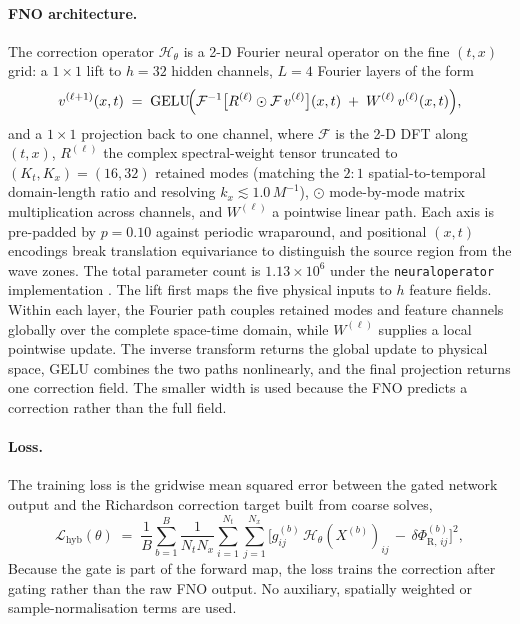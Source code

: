 \paragraph{FNO architecture.} The correction operator
$\mathcal{H}_{\theta}$ is a 2-D Fourier neural operator
\citep{Li2021fno,Kovachki2023neuralop} on the fine $(t, x)$
grid: a $1\times 1$ lift to $h = 32$ hidden channels, $L = 4$
Fourier layers of the form
\begin{equation}
  v^{(\ell+1)}(x, t)
  \;=\; \mathrm{GELU}\!\Bigl(
         \mathcal{F}^{-1}\bigl[R^{(\ell)} \odot
         \mathcal{F}\,v^{(\ell)}\bigr](x, t)
         \;+\; W^{(\ell)}\,v^{(\ell)}(x, t)
       \Bigr),
  \label{eq:hyb-fno-layer}
\end{equation}
and a $1\times 1$ projection back to one channel, where
$\mathcal{F}$ is the 2-D DFT along $(t, x)$, $R^{(\ell)}$ the
complex spectral-weight tensor truncated to
$(K_{t}, K_{x}) = (16, 32)$ retained modes (matching the $2{:}1$
spatial-to-temporal domain-length ratio and resolving
$k_{x} \lesssim 1.0\,M^{-1}$), $\odot$ mode-by-mode matrix
multiplication across channels, and $W^{(\ell)}$ a pointwise
linear path. Each axis is pre-padded by $p = 0.10$ against
periodic wraparound, and positional $(x, t)$ encodings break
translation equivariance to distinguish the source region from
the wave zones. The total parameter count is $1.13\times 10^{6}$ under the
\texttt{neuraloperator} implementation \citep{Kovachki2023neuralop}.
The lift first maps the five physical inputs to $h$ feature fields.
Within each layer, the Fourier path couples retained modes and feature
channels globally over the complete space-time domain, while
$W^{(\ell)}$ supplies a local pointwise update. The inverse transform
returns the global update to physical space, GELU combines the two
paths nonlinearly, and the final projection returns one correction
field. The smaller width is used because the FNO predicts a
correction rather than the full field.

\paragraph{Loss.} The training loss is the gridwise mean
squared error between the gated network output and the
Richardson correction target built from coarse solves,
\begin{equation}
  \mathcal{L}_{\mathrm{hyb}}(\theta)
  \;=\; \frac{1}{B}\sum_{b=1}^{B}
         \frac{1}{N_{t} N_{x}}
         \sum_{i=1}^{N_{t}}\sum_{j=1}^{N_{x}}
         \bigl[
           g^{(b)}_{ij}\,\mathcal{H}_{\theta}(X^{(b)})_{ij}
           \,-\, \delta\Phi^{(b)}_{\mathrm{R},\,ij}
         \bigr]^{2},
  \label{eq:hyb-loss}
\end{equation}
Because the gate is part of the forward map, the loss trains the
correction after gating rather than the raw FNO output. No auxiliary,
spatially weighted or sample-normalisation terms are used.

